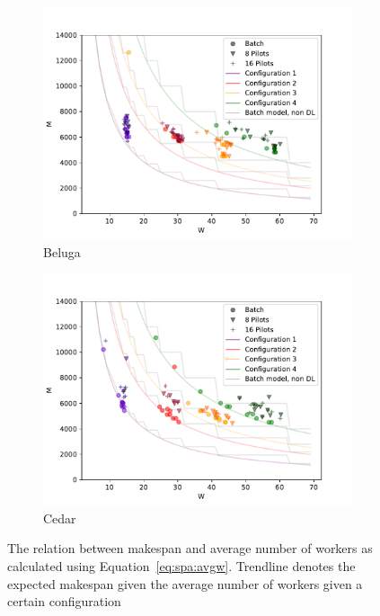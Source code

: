 	\begin{figure}
	    \centering
	    \begin{subfigure}[b]{0.475\textwidth}
		\centering
		\includegraphics[width=\textwidth]{figures/spa/mw_beluga}
		\caption[]%
		{{\small Beluga}}
		\label{fig:spa:mwbeluga}
	    \end{subfigure}
	    \hfill
	    \begin{subfigure}[b]{0.475\textwidth}
		\centering
		\includegraphics[width=\textwidth]{figures/spa/mw_cedar}
		\caption[]%
		{{\small Cedar}}
		\label{fig:spa:mwcedar}
	    \end{subfigure}
	    \caption{\small The relation between makespan and average number of
	    workers as calculated using Equation~\ref{eq:spa:avgw}. Trendline
	    denotes the expected makespan given the average number of workers
	    given a certain configuration}
	    \label{fig:spa:mwall}
	\end{figure}
    
